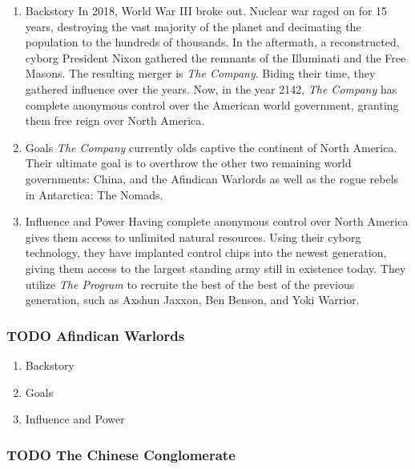 \documentclass[11pt]{article}
\begin{document}
\begin{enumerate}
\item Backstory
\label{sec:org118bb5d}
In 2018, World War III broke out. Nuclear war raged on for 15 years, destroying the vast majority of the planet and decimating the population to the hundreds of thousands. In the aftermath, a reconstructed, cyborg President Nixon gathered the remnants of the Illuminati and the Free Masons. The resulting merger is \emph{The Company}. Biding their time, they gathered influence over the years. Now, in the year 2142, \emph{The Company} has complete anonymous control over the American world government, granting them free reign over North America.

\item Goals
\label{sec:orgee58dfa}
\emph{The Company} currently olds captive the continent of North America. Their ultimate goal is to overthrow the other two remaining world governments: China, and the Afindican Warlords as well as the rogue rebels in Antarctica: The Nomads.

\item Influence and Power
\label{sec:org50465f0}
Having complete anonymous control over North America gives them access to unlimited natural resources. Using their cyborg technology, they have implanted control chips into the newest generation, giving them access to the largest standing army still in existence today. They utilize \emph{The Program} to recruite the best of the best of the previous generation, such as Axshun Jaxxon, Ben Benson, and Yoki Warrior.
\end{enumerate}

\subsubsection{{\bfseries\sffamily TODO} Afindican Warlords}
\label{sec:org8ccb676}

\begin{enumerate}
\item Backstory
\label{sec:org31a25bb}

\item Goals
\label{sec:org14fe4b2}

\item Influence and Power
\label{sec:org6e51afb}
\end{enumerate}

\subsubsection{{\bfseries\sffamily TODO} The Chinese Conglomerate}
\label{sec:org986e795}
\end{document}
